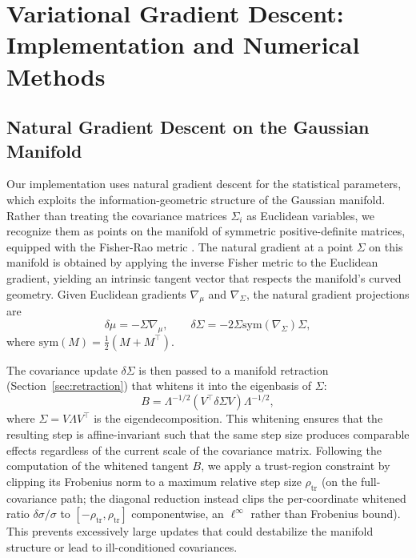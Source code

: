 \documentclass[twoside,11pt]{article}
\begin{document}
\section{Variational Gradient Descent: Implementation and Numerical Methods}
\label{app:variational_descent}


\subsection{Natural Gradient Descent on the Gaussian Manifold}
Our implementation uses natural gradient descent for the statistical parameters, which exploits the information-geometric structure of the Gaussian manifold. Rather than treating the covariance matrices $\Sigma_i$ as Euclidean variables, we recognize them as points on the manifold of symmetric positive-definite matrices, equipped with the Fisher-Rao metric \citep{amari1998natural,Cencov1982,Amari2016}. The natural gradient at a point $\Sigma$ on this manifold is obtained by applying the inverse Fisher metric to the Euclidean gradient, yielding an intrinsic tangent vector that respects the manifold's curved geometry. Given Euclidean gradients $\nabla_\mu$ and $\nabla_\Sigma$, the natural gradient projections are
\begin{equation}
\delta\mu = -\Sigma \nabla_\mu, \qquad
\delta\Sigma = -2 \Sigma \mathrm{sym}(\nabla_\Sigma) \Sigma,
\end{equation}
where $\mathrm{sym}(M) = \tfrac{1}{2}(M + M^\top)$.

The covariance update $\delta\Sigma$ is then passed to a manifold retraction (Section~\ref{sec:retraction}) that whitens it into the eigenbasis of $\Sigma$:
\begin{equation}
B = \Lambda^{-1/2} (V^\top \delta\Sigma V) \Lambda^{-1/2},
\end{equation}
where $\Sigma = V \Lambda V^\top$ is the eigendecomposition. This whitening ensures that the resulting step is affine-invariant such that the same step size produces comparable effects regardless of the current scale of the covariance matrix. Following the computation of the whitened tangent $B$, we apply a trust-region constraint by clipping its Frobenius norm to a maximum relative step size $\rho_{\mathrm{tr}}$ (on the full-covariance path; the diagonal reduction instead clips the per-coordinate whitened ratio $\delta\sigma/\sigma$ to $[-\rho_{\mathrm{tr}}, \rho_{\mathrm{tr}}]$ componentwise, an $\ell^{\infty}$ rather than Frobenius bound). This prevents excessively large updates that could destabilize the manifold structure or lead to ill-conditioned covariances.
\end{document}
